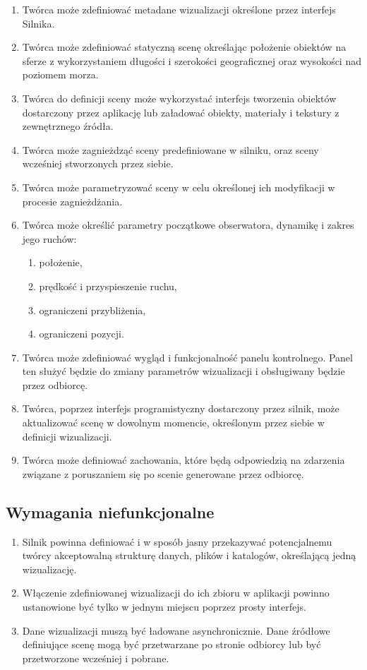 \begin{enumerate}
    \item Twórca może zdefiniować metadane wizualizacji określone przez interfejs Silnika.
    \item Twórca może zdefiniować statyczną scenę określając położenie obiektów na sferze z wykorzystaniem
          długości i szerokości geograficznej oraz wysokości nad poziomem morza.
    \item Twórca do definicji sceny może wykorzystać interfejs tworzenia obiektów dostarczony przez aplikację
          lub załadować obiekty, materiały i tekstury z zewnętrznego źródła.
    \item Twórca może zagnieżdząć sceny predefiniowane w silniku, oraz sceny wcześniej stworzonych przez siebie.
    \item Twórca może parametryzować sceny w celu określonej ich modyfikacji w procesie zagnieżdżania.
    \item Twórca może określić parametry początkowe obserwatora, dynamikę i zakres jego ruchów:
          \begin{enumerate}
              \item położenie,
              \item prędkość i przyspieszenie ruchu,
              \item ograniczeni przybliżenia,
              \item ograniczeni pozycji.
          \end{enumerate}
    \item Twórca może zdefiniować wygląd i funkcjonalność panelu kontrolnego.
          Panel ten służyć będzie do zmiany parametrów wizualizacji i obsługiwany będzie przez odbiorcę.
    \item Twórca, poprzez interfejs programistyczny dostarczony przez silnik, może aktualizować scenę w dowolnym momencie, określonym przez siebie w definicji wizualizacji.
    \item Twórca może definiować zachowania, które będą odpowiedzią na zdarzenia związane z poruszaniem się po scenie generowane przez odbiorcę.
\end{enumerate}

\subsection{Wymagania niefunkcjonalne}

\begin{enumerate}
    \item Silnik powinna definiować i w sposób jasny przekazywać potencjalnemu twórcy akceptowalną strukturę danych, plików i katalogów, określającą jedną wizualizację.
    \item Włączenie zdefiniowanej wizualizacji do ich zbioru w aplikacji powinno ustanowione być tylko w jednym miejscu poprzez prosty interfejs.
    \item Dane wizualizacji muszą być ładowane asynchronicznie. Dane źródłowe definiujące scenę mogą być przetwarzane po stronie odbiorcy lub być przetworzone wcześniej i pobrane.
\end{enumerate}

